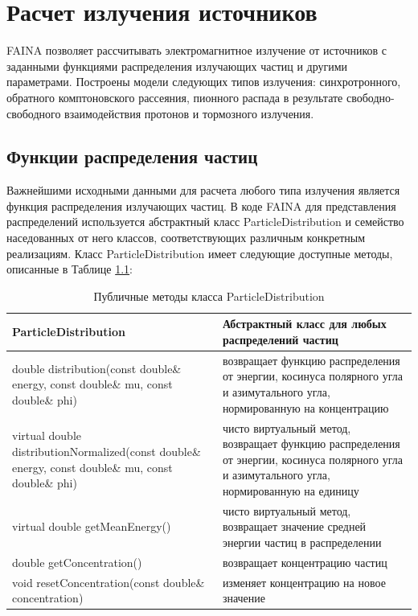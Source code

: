 \chapter{Расчет излучения источников}\label{radiation}
FAINA позволяет рассчитывать электромагнитное излучение от источников с заданными функциями распределения излучающих частиц и другими параметрами. Построены модели следующих типов излучения: синхротронного, обратного комптоновского рассеяния, пионного распада в результате свободно-свободного взаимодействия протонов и тормозного излучения.

\section{Функции распределения частиц}

Важнейшими исходными данными для расчета любого типа излучения является функция распределения излучающих частиц. В коде FAINA для представления распределений используется абстрактный класс ParticleDistribution и семейство наседованных от него классов, соответствующих различным конкретным реализациям. Класс ParticleDistribution имеет следующие доступные методы, описанные в Таблице \ref{ParticleDistribution}:

	\begin{table}
	\begin{center}
		\caption{Публичные методы класса ParticleDistribution }
		\label{ParticleDistribution}
		\begin{small}
		\begin{tabularx}{\textwidth}{|X|X|}
			\hline
			\textbf{ParticleDistribution} & Абстрактный класс для любых распределений частиц\\
			\hline
			double distribution(const double\& energy, const double\& mu, const double\& phi) & возвращает функцию распределения от энергии, косинуса полярного угла и азимутального угла, нормированную на концентрацию \\
			\hline
			virtual double distributionNormalized(const double\& energy, const double\& mu, const double\& phi) & чисто виртуальный метод, возвращает функцию распределения от энергии, косинуса полярного угла и азимутального угла, нормированную на единицу \\
			\hline
			virtual double getMeanEnergy() & чисто виртуальный метод, возвращает значение средней энергии частиц в распределении\\
			\hline
			double getConcentration() & возвращает концентрацию частиц\\
			\hline
			void resetConcentration(const double\& concentration) & изменяет концентрацию на новое значение \\
			\hline
		\end{tabularx}
	    \end{small}
	\end{center}
\end{table}

